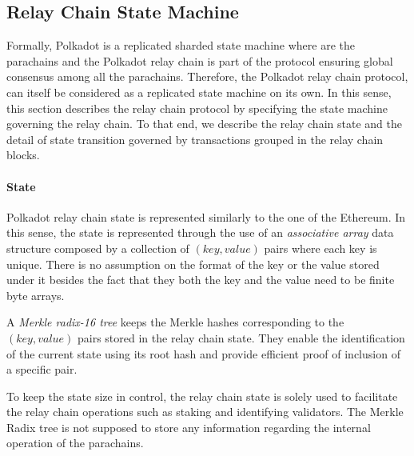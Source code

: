 \subsection{Relay Chain State Machine}\label{sec:relaychain}

Formally, Polkadot is a replicated sharded state machine where  are the parachains and the Polkadot relay chain is part of the protocol ensuring global consensus among all the parachains. Therefore, the Polkadot relay chain protocol, can itself be considered as a replicated state machine on its own. In this sense, this section describes the relay chain protocol by specifying the state machine governing the relay chain. To that end, we describe the relay chain state and the detail of state transition governed by transactions grouped in the relay chain blocks.

\paragraph{State} Polkadot relay chain state is represented similarly to the one of the Ethereum. In this sense, the state is represented through the use of an \emph{associative array} data structure composed by a collection of $(key, value)$ pairs where each key is unique. There is no assumption on the format of the key or the value stored under it besides the fact that they both the key and the value need to be finite byte arrays.

A \emph{Merkle radix-16 tree} keeps the Merkle hashes corresponding to the $(key, value)$ pairs stored in the relay chain state. They enable the identification of the current state using its root hash and provide efficient
proof of inclusion of a specific pair.

To keep the state size in control, the relay chain state is solely used to facilitate the relay chain operations such as staking and identifying validators. The Merkle Radix tree is not supposed to store any information regarding the internal operation of the parachains.

